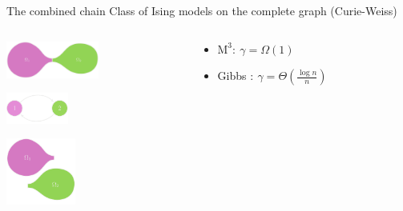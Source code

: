 \documentclass[mathserif]{beamer}
\begin{document}
\begin{frame}{The combined chain}
\vspace{0.5em}
Class of Ising models on the complete graph (Curie-Weiss)

\vspace{1em}
\begin{columns}[t]
\begin{column}{0.3\textwidth}
\centering

\vspace{0.1em}
\includegraphics[width=1.2in]{figures/bottleneck1.pdf}

\vspace{2.5em}
\includegraphics[width=0.8in]{figures/projection.pdf}

\vspace{2em}
\hspace{0.3em}\includegraphics[width=0.9in]{figures/restriction.pdf}
\end{column}

\begin{column}{0.66\textwidth}
\vspace{-1em}

\vspace{1.4em}
\begin{itemize}
\item<4-> $\mathrm{M}^3:\ \gamma = \Omega(1)$ 
\end{itemize}

\vspace{3.2em}
\begin{itemize}
\item<3-> Gibbs $:\ \gamma = \Theta\left( \displaystyle\frac{\log n}{n} \right)$ 
\end{itemize}
\end{column}
\end{columns}

\end{frame}
\end{document}
